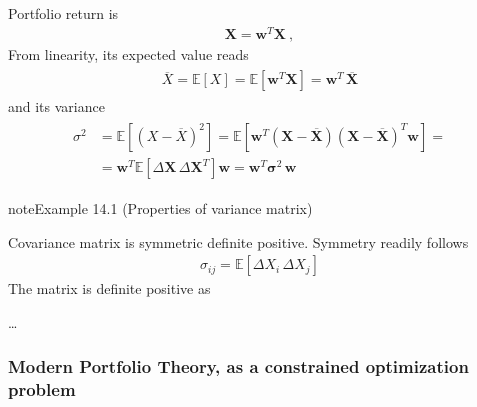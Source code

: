 \documentclass[letterpaper,10pt,english]{jupyterBook}
\begin{document}
\sphinxAtStartPar
Portfolio return is
\begin{equation*}
\begin{split}\mathbf{X} = \mathbf{w}^T \mathbf{X} \ ,\end{split}
\end{equation*}
\sphinxAtStartPar
From linearity, its expected value reads
\begin{equation*}
\begin{split}\begin{aligned}
  \overline{X} = \mathbb{E} \left[ X \right] =  \mathbb{E} \left[ \mathbf{w}^T \mathbf{X} \right] = \mathbf{w}^T \, \overline{\mathbf{X}} 
\end{aligned}\end{split}
\end{equation*}
\sphinxAtStartPar
and its variance
\begin{equation*}
\begin{split}\begin{aligned}
  \sigma^2
  & = \mathbb{E} \left[ (X-\overline{X})^2 \right]      
    = \mathbb{E} \left[ \mathbf{w}^T \left( \mathbf{X} - \overline{\mathbf{X}} \right)\left( \mathbf{X} - \overline{\mathbf{X}} \right)^T \mathbf{w}  \right] = \\
  & = \mathbf{w}^T \mathbb{E} \left[ \Delta \mathbf{X} \, \Delta \mathbf{X}^T \right] \mathbf{w}
    = \mathbf{w}^T \boldsymbol{\sigma}^2 \, \mathbf{w}
\end{aligned}\end{split}
\end{equation*}\label{ch/investing/mpt:example-0}
\begin{sphinxadmonition}{note}{Example 14.1 (Properties of variance matrix)}



\sphinxAtStartPar
Covariance matrix is symmetric definite positive. Symmetry readily follows
\begin{equation*}
\begin{split}\sigma_{ij} = \mathbb{E}\left[ \Delta X_i \, \Delta X_j \right]\end{split}
\end{equation*}
\sphinxAtStartPar
The matrix is definite positive as

\sphinxAtStartPar
…
\end{sphinxadmonition}
\subsubsection*{Modern Portfolio Theory, as a constrained optimization problem}
\end{document}
